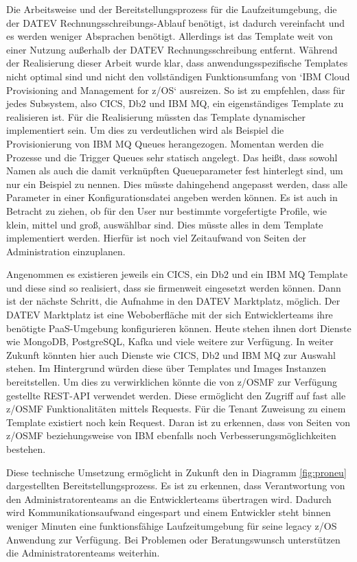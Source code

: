 Die Arbeitsweise und der Bereitstellungsprozess für die Laufzeitumgebung, die der DATEV Rechnungsschreibungs-Ablauf benötigt, ist dadurch vereinfacht und es werden weniger Absprachen benötigt.
Allerdings ist das Template weit von einer Nutzung außerhalb der DATEV Rechnungsschreibung entfernt.
Während der Realisierung dieser Arbeit wurde klar, dass anwendungsspezifische Templates nicht optimal sind und nicht den vollständigen Funktionsumfang von `IBM Cloud Provisioning and Management for z/OS` ausreizen.
So ist zu empfehlen, dass für jedes Subsystem, also CICS, Db2 und IBM MQ, ein eigenständiges Template zu realisieren ist.
Für die Realisierung müssten das Template dynamischer implementiert sein.
Um dies zu verdeutlichen wird als Beispiel die Provisionierung von IBM MQ Queues herangezogen.
Momentan werden die Prozesse und die Trigger Queues sehr statisch angelegt.
Das heißt, dass sowohl Namen als auch die damit verknüpften Queueparameter fest hinterlegt sind, um nur ein Beispiel zu nennen.
Dies müsste dahingehend angepasst werden, dass alle Parameter in einer Konfigurationsdatei angeben werden können.
Es ist auch in Betracht zu ziehen, ob für den User nur bestimmte vorgefertigte Profile, wie \glqq klein\grqq, \glqq mittel\grqq{} und \glqq groß\grqq, auswählbar sind.
Dies müsste alles in dem Template implementiert werden.
Hierfür ist noch viel Zeitaufwand von Seiten der Administration einzuplanen.

Angenommen es existieren jeweils ein CICS, ein Db2 und ein IBM MQ Template und diese sind so realisiert, dass sie firmenweit eingesetzt werden können.
Dann ist der nächste Schritt, die Aufnahme in den \glqq DATEV Marktplatz\grqq, möglich.
Der \glqq DATEV Marktplatz\grqq{} ist eine Weboberfläche mit der sich Entwicklerteams ihre benötigte PaaS-Umgebung konfigurieren können.
Heute stehen ihnen dort Dienste wie MongoDB, PostgreSQL, Kafka und viele weitere zur Verfügung.
In weiter Zukunft könnten hier auch Dienste wie CICS, Db2 und IBM MQ zur Auswahl stehen.
Im Hintergrund würden diese über Templates und Images Instanzen bereitstellen.
Um dies zu verwirklichen könnte die von z/OSMF zur Verfügung gestellte REST-API verwendet werden.
Diese ermöglicht den Zugriff auf fast alle z/OSMF Funktionalitäten mittels Requests.
Für die \glqq Tenant\grqq{} Zuweisung zu einem Template existiert noch kein Request.
Daran ist zu erkennen, dass von Seiten von z/OSMF beziehungsweise von IBM ebenfalls noch Verbesserungsmöglichkeiten bestehen.

Diese technische Umsetzung ermöglicht in Zukunft den in Diagramm \ref{fig:proneu} dargestellten Bereitstellungsprozess.
Es ist zu erkennen, dass Verantwortung von den Administratorenteams an die Entwicklerteams übertragen wird.
Dadurch wird Kommunikationsaufwand eingespart und einem Entwickler steht binnen weniger Minuten eine funktionsfähige Laufzeitumgebung für seine legacy z/OS Anwendung zur Verfügung.
Bei Problemen oder Beratungswunsch unterstützen die Administratorenteams weiterhin.

